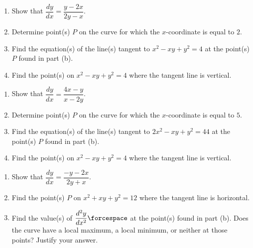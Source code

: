 \begin{enumerate}[label=\hspace{11pt}(\alph*), align=left, leftmargin=*, labelsep=0.25em]
    \item Show that $\dfrac{dy}{dx} = \dfrac{y - 2x}{2y - x}$.
    \item Determine point(s) $P$ on the curve for which the $x$-coordinate is equal to $2$.
    \item Find the equation(s) of the line(s) tangent to $x^2 - xy + y^2 = 4$ at the point(s) $P$ found in part (b).
    \item Find the point(s) on $x^2 - xy + y^2 = 4$ where the tangent line is vertical.
\end{enumerate} \vspace{11pt}

\begin{enumerate}[label=\hspace{11pt}(\alph*), align=left, leftmargin=*, labelsep=0.25em]
    \item Show that $\dfrac{dy}{dx} = \dfrac{4x - y}{x - 2y}$.
    \item Determine point(s) $P$ on the curve for which the $x$-coordinate is equal to $5$.
    \item Find the equation(s) of the line(s) tangent to $2x^2 - xy + y^2 = 44$ at the point(s) $P$ found in part (b).
    \item Find the point(s) on $x^2 - xy + y^2 = 4$ where the tangent line is vertical.
\end{enumerate} \vspace{11pt}

\begin{enumerate}[label=\hspace{11pt}(\alph*), align=left, leftmargin=*, labelsep=0.25em]
    \item Show that $\dfrac{dy}{dx} = \dfrac{-y - 2x}{2y + x}$.
    \item Find the point(s) $P$ on $x^2 + xy + y^2 = 12$ where the tangent line is horizontal.
    \item Find the value(s) of $\dfrac{d^2y}{dx^2} \forcespace$ at the point(s) found in part (b). Does the curve have a local maximum, a local minimum, or neither at those points? Justify your answer.
\end{enumerate} \vspace{11pt}
 
